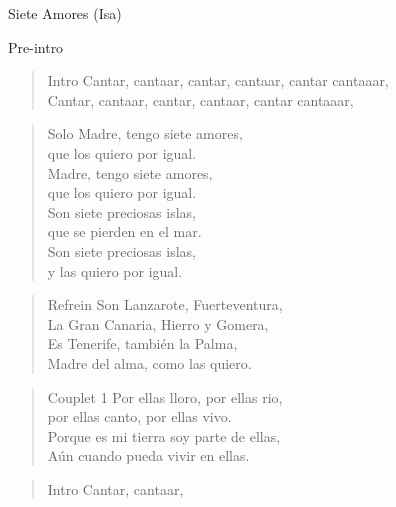 \begin{song}[vals]{Siete Amores (Isa)}
\begin{instrumental}{Pre-intro}
   \\
   
\end{instrumental}

\begin{verse}{Intro}
Cantar, cantaar, cantar, cantaar, cantar cantaaar,\\
Cantar, cantaar, cantar, cantaar, cantar cantaaar,\\
\end{verse}

\begin{verse}{Solo}
Madre, tengo siete amores,\\
que los quiero por igual.\\
Madre, tengo siete amores,\\
que los quiero por igual.\\
Son siete preciosas islas,\\
que se pierden en el mar.\\
Son siete preciosas islas,\\
y las quiero por igual.\hspace{1.5em}\hspace{1.5em}\\
\end{verse}
\begin{verse}{Refrein}
Son Lanzarote, Fuerteventura,\\
La Gran Canaria, Hierro y Gomera,\\
Es Tenerife, también la Palma,\\
Madre del alma, como las quiero.\\
\end{verse}
\begin{verse}{Couplet 1}
Por ellas lloro, por ellas rio,\\
por ellas canto, por ellas vivo.\\
Porque es mi tierra soy parte de ellas,\\
Aún cuando pueda vivir en ellas.\hspace{2.5em}\hspace{1.5em}\\
\end{verse}
\begin{verse}{Intro}
Cantar, cantaar,
\end{verse}
\end{song}

